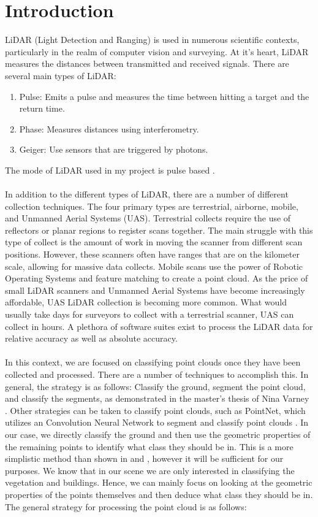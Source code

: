 \documentclass[11pt]{article}
\theoremstyle{definition}
\begin{document}
	\section{Introduction}\label{sec:intro}
	LiDAR (Light Detection and Ranging) is used in numerous scientific contexts, particularly in the realm of computer vision and surveying.  At it's heart, LiDAR measures the distances between transmitted and received signals.  There are several main types of LiDAR:
	\begin{enumerate}  
		\item Pulse: Emits a pulse and measures the time between hitting a target and the return time. 
		\item Phase: Measures distances using interferometry. 
		\item Geiger: Use sensors that are triggered by photons. 

	\end{enumerate}
	The mode of LiDAR used in my project is pulse based \cite{pdal}. 
	\\\\
	In addition to the different types of LiDAR, there are a number of different collection techniques.  The four primary types are terrestrial, airborne, mobile, and Unmanned Aerial Systems (UAS).  Terrestrial collects require the use of reflectors or planar regions to register scans together. The main struggle with this type of collect is the amount of work in moving the scanner from different scan positions.  However, these scanners often have ranges that are on the kilometer scale, allowing for massive data collects.  Mobile scans use the power of Robotic Operating Systems and feature matching to create a point cloud.  As the price of small LiDAR scanners and Unmanned Aerial Systems have become increasingly affordable, UAS LiDAR collection is becoming more common.  What would usually take days for surveyors to collect with a terrestrial scanner, UAS can collect in hours.  A plethora of software suites exist to process the LiDAR data for relative accuracy as well as absolute accuracy.    
	\\\\
	In this context, we are focused on classifying point clouds once they have been collected and processed.  There are a number of techniques to accomplish this.  In general, the strategy is as follows: Classify the ground, segment the point cloud, and classify the segments, as demonstrated in the master's thesis of Nina Varney \cite{varney}.  Other strategies can be taken to classify point clouds, such as PointNet, which utilizes an Convolution Neural Network to segment and classify point clouds \cite{PointNet}.  In our case, we directly classify the ground and then use the geometric properties of the remaining points to identify what class they should be in.  This is a more simplistic method than shown in \cite{PointNet} and \cite{varney}, however it will be sufficient for our purposes.  We know that in our scene we are only interested in classifying the vegetation and buildings.  Hence, we can mainly focus on looking at the geometric properties of the points themselves and then deduce what class they should be in.  The general strategy for processing the point cloud is as follows:  
\end{document}
